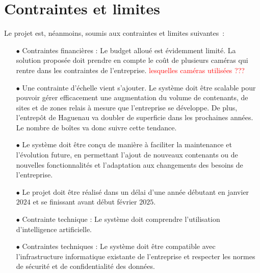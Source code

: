 \section{Contraintes et limites}

Le projet est, néanmoins, soumis aux contraintes et limites suivantes~:\\

\begin{itemize}
\item[$\bullet$] Contraintes financières : Le budget alloué est
  évidemment limité. La solution proposée doit prendre en compte le
  coût de plusieurs caméras qui rentre dans les contraintes de
  l'entreprise. \textcolor{red}{lesquelles caméras utilisées ???}
\item[$\bullet$] Une contrainte d'échelle vient s'ajouter. Le système
  doit être scalable pour pouvoir gérer efficacement une augmentation
  du volume de contenants, de sites et de zones relais à mesure que
  l'entreprise se développe. De plus, l'entrepôt de Haguenau va
  doubler de superficie dans les prochaines années. Le nombre de
  boîtes va donc suivre cette tendance.
\item[$\bullet$] Le système doit être conçu de manière à faciliter la
  maintenance et l'évolution future, en permettant l'ajout de nouveaux
  contenants ou de nouvelles fonctionnalités et l'adaptation aux
  changements des besoins de l'entreprise.
\item[$\bullet$] Le projet doit être réalisé dans un délai d'une année
  débutant en janvier $2024$ et se finissant avant début février $2025$.
\item[$\bullet$] Contrainte technique : Le système doit comprendre
  l'utilisation d'intelligence artificielle.
\item[$\bullet$] Contraintes techniques : Le système doit être
  compatible avec l'infrastructure informatique existante de
  l'entreprise et respecter les normes de sécurité et de
  confidentialité des données.
\end{itemize}
